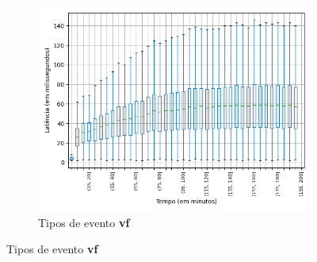 \begin{figure}
\centering
\begin{subfigure}{.5\textwidth}
\centering
\includegraphics[width=\textwidth]{figuras/graphics/boxplot_7-dez-su_vf.png}
\caption{Tipos de evento \textbf{vf}}
\label{fig:BoxPlot_vf_SU_7-dez-su}
\end{subfigure}%


\end{figure}
